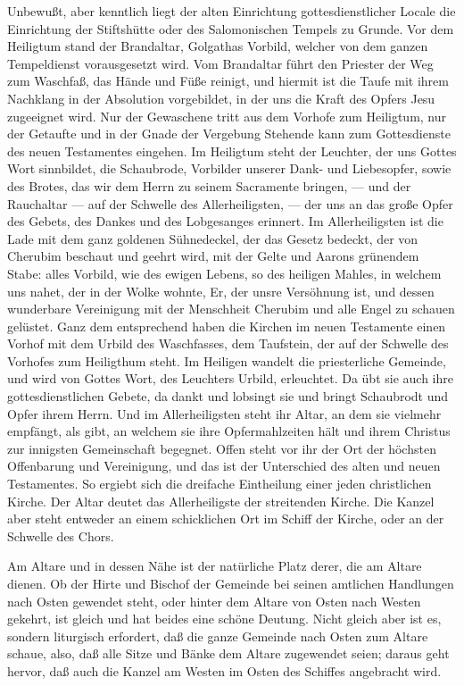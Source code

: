 Unbewußt, aber kenntlich liegt der alten Einrichtung gottesdienstlicher Locale die Einrichtung der Stiftshütte oder des Salomonischen Tempels zu Grunde. Vor dem Heiligtum stand der Brandaltar, Golgathas Vorbild, welcher von dem ganzen Tempeldienst vorausgesetzt wird. Vom Brandaltar führt den Priester der Weg zum Waschfaß, das Hände und Füße reinigt, und hiermit ist die Taufe mit ihrem Nachklang in der Absolution vorgebildet, in der uns die Kraft des Opfers Jesu zugeeignet wird. Nur der Gewaschene tritt aus dem Vorhofe zum Heiligtum, nur der Getaufte und in der Gnade der Vergebung Stehende kann zum Gottesdienste des neuen Testamentes eingehen. Im Heiligtum steht der Leuchter, der uns Gottes Wort sinnbildet, die Schaubrode, Vorbilder unserer Dank- und Liebesopfer, sowie des Brotes, das wir dem Herrn
zu seinem Sacramente bringen, — und der Rauchaltar — auf der Schwelle des Allerheiligsten, — der uns an das große Opfer des Gebets, des Dankes und des Lobgesanges erinnert. Im Allerheiligsten ist die Lade mit dem ganz goldenen Sühnedeckel, der das Gesetz bedeckt, der von Cherubim beschaut und geehrt wird, mit der Gelte und Aarons grünendem Stabe: alles Vorbild, wie des ewigen Lebens, so des heiligen Mahles, in welchem uns nahet, der in der Wolke wohnte, Er, der unsre Versöhnung ist, und dessen wunderbare Vereinigung mit der Menschheit Cherubim und alle Engel zu schauen gelüstet. Ganz dem entsprechend haben die Kirchen im neuen Testamente einen Vorhof mit dem Urbild des Waschfasses, dem Taufstein, der auf der Schwelle des Vorhofes zum Heiligthum steht. Im Heiligen wandelt die priesterliche Gemeinde, und wird von Gottes Wort, des Leuchters Urbild, erleuchtet. Da übt sie auch ihre gottesdienstlichen Gebete, da dankt und lobsingt sie und bringt Schaubrodt und Opfer ihrem Herrn. Und im Allerheiligsten steht ihr Altar, an dem sie vielmehr empfängt, als gibt, an welchem sie ihre Opfermahlzeiten hält und ihrem Christus zur innigsten Gemeinschaft begegnet. Offen steht vor ihr der Ort der höchsten Offenbarung und Vereinigung, und das ist der Unterschied des alten und neuen Testamentes. So ergiebt sich die dreifache Eintheilung einer jeden christlichen Kirche. Der Altar deutet das Allerheiligste der streitenden Kirche. Die Kanzel aber steht entweder an einem schicklichen Ort im Schiff der Kirche, oder an der Schwelle des Chors.

Am Altare und in dessen Nähe ist der natürliche Platz derer, die am Altare dienen. Ob der Hirte und Bischof der Gemeinde bei seinen amtlichen Handlungen nach Osten gewendet steht, oder hinter dem Altare von Osten nach Westen gekehrt, ist gleich und hat beides eine schöne Deutung. Nicht gleich aber ist es, sondern liturgisch erfordert, daß die ganze Gemeinde nach Osten zum Altare schaue, also, daß alle Sitze und Bänke dem Altare zugewendet seien; daraus geht hervor, daß auch die Kanzel am Westen im Osten des Schiffes angebracht wird.

